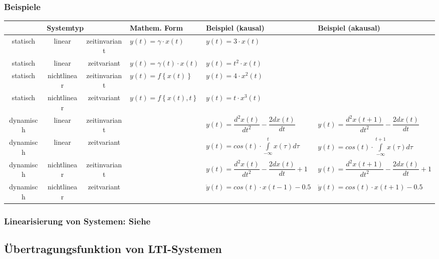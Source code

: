 		
		\subsubsection{Beispiele }

			\bgroup
			\setlength{\tabcolsep}{1.3mm}
			\begin{tabularx}{\textwidth}{|c|c|c|l|l|X|}
			\hline
				\multicolumn{3}{|c|}{\textbf{Systemtyp}}
			&	\textbf{Mathem. Form}
			&	\textbf{Beispiel (kausal)}
			&	\textbf{Beispiel (akausal)}
			\\ \hline
				statisch
			&	linear
			&	zeitinvariant
			&	$y(t) = \gamma \cdot x(t)$
			&	$y(t) = 3 \cdot x(t)$
			&	
			\\ \hline
				statisch
			&	linear
			&	zeitvariant
			&	$y(t) = \gamma(t) \cdot x(t)$
			&	$y(t) = t^2 \cdot x(t)$
			&	
			\\ \hline
				statisch
			&	nichtlinear
			&	zeitinvariant
			&	$y(t) = f \left\lbrace  x(t) \right\rbrace $
			&	$y(t) = 4 \cdot x^2(t)$
			&	
			\\ \hline
				statisch
			&	nichtlinear
			&	zeitvariant
			&	$y(t) = f \left\lbrace  x(t),t \right\rbrace $
			&	$y(t) = t \cdot x^3(t)$
			&	
			\\ \hline
				dynamisch
			&	linear
			&	zeitinvariant
			&	
			&	$y(t) = \dfrac{d^2 x(t)}{d t^2} - \dfrac{2 dx(t)}{dt}$
			&	$y(t) = \dfrac{d^2 x(t+1)}{d t^2} - \dfrac{2 dx(t)}{dt}$
			\\ \hline
				dynamisch
			&	linear
			&	zeitvariant
			&	
			&	$y(t) = cos(t) \cdot \int\limits_{-\infty}^{t} x(\tau) d\tau $
			&	$y(t) = cos(t) \cdot \int\limits_{-\infty}^{t+1} x(\tau) d\tau $
			\\ \hline
				dynamisch
			&	nichtlinear
			&	zeitinvariant
			&	
			&	$y(t) = \dfrac{d^2 x(t)}{d t^2} - \dfrac{2 dx(t)}{dt} + 1$
			&	$y(t) = \dfrac{d^2 x(t+1)}{d t^2} - \dfrac{2 dx(t)}{dt} + 1$
			\\ \hline
				dynamisch
			&	nichtlinear
			&	zeitvariant
			&	
			&	$ \ddot y(t) = cos(t) \cdot x(t-1) - 0.5$
			&	$ \ddot y(t) = cos(t) \cdot x(t+1) - 0.5$
			\\ \hline
			\end{tabularx}
			\egroup
			
			
	\subsubsection{Linearisierung von Systemen: Siehe }

	\subsection{Übertragungsfunktion von LTI-Systemen }
	
